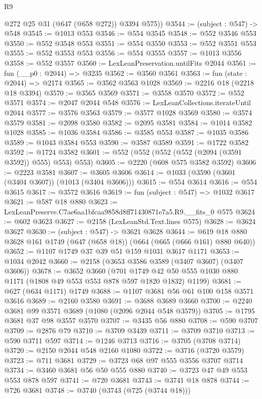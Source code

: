 \begin{lexlean}{R9}
\begin{coremodule}
        @272
        @25
        @31
        (@647 (@658 @272))
        @3394
        @575))
@3544 := (subject : @547) -> @548
@3545 := @1013 @553
@3546 := @554 @3545
@3548 := @552 @3546 @553
@3550 := @552 @3548 @553
@3551 := @554 @3550
@3553 := @552 @3551 @553
@3555 := @552 @3553 @553
@3556 := @554 @3555
@3557 := @1013 @3556
@3558 := @552 @3557
@3560 := LexLeanPreservation.untilFits @2044
@3561 := fun (__p0 : @2044) => @3235
@3562 := @3560 @3561
@3563 := fun (state : @2044) => @2174
@3565 := @3562 @3563 @1028
@3569 := @2216 @18 (@2218 @18 @3394)
@3570 := @3565 @3569
@3571 := @3558 @3570
@3572 := @552 @3571
@3574 := @2047 @2044 @548
@3576 := LexLeanCollections.iterateUntil @2044
@3577 := @3576 @3563
@3579 := @3577 @1028 @3569
@3580 := @3574 @3579
@3581 := @2098 @3580
@3582 := @2095 @3581
@3584 := @1014 @3582 @1028
@3585 := @1036 @3584
@3586 := @3585 @553
@3587 := @1035 @3586
@3589 := @1043 @3584 @553
@3590 := @3587 @3589
@3591 := @1722 @3582
@3592 := @1724 @3582
@3601 := @552 (@552 (@552 (@552 (@2094 (@3591 @3592)) @555) @553) @553)
@3605 := @2220 (@608 @575 @3582 @3592)
@3606 := @2223 @3581
@3607 := @3605 @3606
@3614 := @1033 (@3590 (@3601 (@3404 @3607)) (@1013 (@3404 @3606)))
@3615 := @554 @3614
@3616 := @554 @3615
@3617 := @3572 @3616
@3619 := fun (subject : @547) => @1032 @3617
@3621 := @587 @18 @880
@3623 := LexLeanPreserve.C7ae6aa1bfcaa9858d8ff71430871e7a5.R9.__fits_0 @575
@3624 := @602 @3623
@3627 := @2158 (LexLeanStd.Text.lines @575)
@3628 := @3624 @3627
@3630 := (subject : @547) -> @3621 @3628
@3644 := @619 @18 @880 @3628 @161 @1749 (@647 (@658 @18)) (@664 (@665 (@666 @161) @880 @640))
@3652 := @1107 @1749 @37 @39 @51 @159 @1031 @3617 @1171
@3653 := @1034 @2042
@3660 := @2158 (@3653 @3586 @3589 (@3407 @3607) (@3407 @3606))
@3678 := @3652
    @3660
    (@701 @1749 @42 @50 @555 @1030 @880 @1171 (@1808 @49 @553 @553 @878 @597 @1820 @1832) @1199)
@3681 := @627 (@634 @1171) @1749
@3688 := @1107 @3681 @56 @61 @100 @158 @3571 @3616
@3689 := @2160 @3580
@3691 := @3688 @3689 @3660
@3700 := @2240 @3681 @99 @3571 @3689 (@1080 (@2096 @2044 @548 @3579))
@3705 := @1795 @3681 @37 @98 @3557 @3570
@3707 := @3435 @56 @880
@3708 := @590 @3707
@3709 := @2876 @79
@3710 := @3709 @3439
@3711 := @3709 @3710
@3713 := @590 @3711 @597
@3714 := @1246 @3713
@3716 := @3705 (@3708 @3714)
@3720 := @2150 @2044 @548 @2160 @1080
@3722 := @3716 (@3720 @3579)
@3723 := @711 @3681
@3729 := @3723 @68 @97 @555 @3556 @3707 @3714
@3734 := @3460 @3681 @56 @50 @555 @880
@3740 := @3723 @47 @49 @553 @553 @878 @597
@3741 := @720 @3681
@3743 := @3741 @18 @878
@3744 := @726 @3681
@3748 := @3740 (@3743 (@725 (@3744 @18)))

\end{coremodule}
\end{lexlean}

